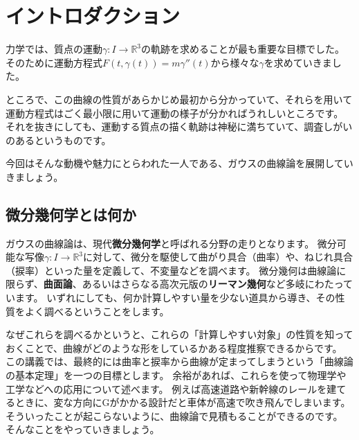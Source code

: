 \chapter{イントロダクション}

力学では、質点の運動$\gamma:I\to\mathbb{R}^3$の軌跡を求めることが最も重要な目標でした。
そのために運動方程式$F(t,\gamma(t))=m\gamma''(t)$から様々な$\gamma$を求めていきました。

ところで、この曲線の性質があらかじめ最初から分かっていて、それらを用いて運動方程式はごく最小限に用いて運動の様子が分かればうれしいところです。
それを抜きにしても、運動する質点の描く軌跡は神秘に満ちていて、調査しがいのあるというものです。

今回はそんな動機や魅力にとらわれた一人である、ガウスの曲線論を展開していきましょう。



\section{微分幾何学とは何か}

ガウスの曲線論は、現代\textbf{微分幾何学}と呼ばれる分野の走りとなります。
微分可能な写像$\gamma:I\to\mathbb{R}^3$に対して、微分を駆使して曲がり具合（曲率）や、ねじれ具合（捩率）といった量を定義して、不変量などを調べます。
微分幾何は曲線論に限らず、\textbf{曲面論}、あるいはさらなる高次元版の\textbf{リーマン幾何}など多岐にわたっています。
いずれにしても、何か計算しやすい量を少ない道具から導き、その性質をよく調べるということをします。

なぜこれらを調べるかというと、これらの「計算しやすい対象」の性質を知っておくことで、曲線がどのような形をしているかある程度推察できるからです。
この講義では、最終的には曲率と捩率から曲線が定まってしまうという「曲線論の基本定理」を一つの目標とします。
余裕があれば、これらを使って物理学や工学などへの応用について述べます。
例えば高速道路や新幹線のレールを建てるときに、変な方向にGがかかる設計だと車体が高速で吹き飛んでしまいます。
そういったことが起こらないように、曲線論で見積もることができるのです。
そんなことをやっていきましょう。
